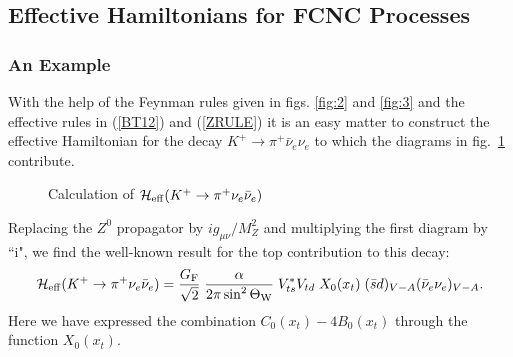 \documentclass[12pt]{article}
\begin{document}
\begin{itemize}
\subsection{Effective Hamiltonians for FCNC Processes}
\subsubsection{An Example}
With the help of the Feynman rules given in figs. \ref{fig:2} and 
\ref{fig:3} and the effective rules in 
(\ref{BT12}) and (\ref{ZRULE}) 
it is an easy
matter to construct the effective Hamiltonian for 
the decay $K^+\to \pi^+\bar\nu_e\nu_e$ to which
the diagrams in fig.\ \ref{fig:9} contribute. 
\begin{figure}[hbt]
\centerline{
\epsfysize=1.6in
}
\caption[]{
Calculation of ${\cal H}_{\rm eff}(K^+\to\pi^+\nu_e\bar\nu_e)$
\label{fig:9}}
\end{figure}

Replacing the $Z^0$ propagator by $i g_{\mu\nu}/M_Z^2$
and multiplying the first diagram 
by ``i", we
find the well-known result for the top contribution to this decay:
\begin{equation}\label{kplus}
{\cal H}_{\rm eff}(K^+\to\pi^+\nu_e\bar\nu_e) = {{G_{\rm F}}\over{\sqrt2}}\;
{{\alpha}\over{2\pi\sin^2\Theta_{\rm W}}}\; V_{ts}^* V_{td}\; 
X_0(x_t)\;
(\bar
s d)_{V-A} (\bar\nu_e\nu_e)_{V-A}.
\end{equation}
Here we have expressed the combination $C_0(x_t)-4 B_0(x_t)$ through
the function $X_0(x_t)$.


\end{itemize}
\end{document}
